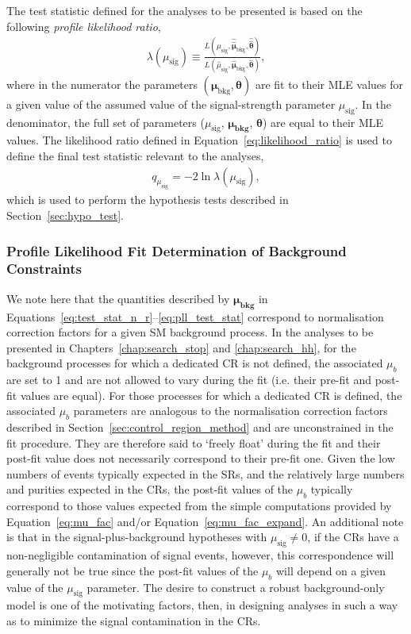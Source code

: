 The test statistic defined for the analyses to be presented is based on the following
\textit{profile likelihood ratio},
\begin{align}
    \lambda(\mu_{\text{sig}}) \equiv
        \frac{
            L(\mu_{\text{sig}}, \hat{\hat{\bm{\mu}}}_{\text{bkg}}, \hat{\hat{\bm{\theta}}})
        }
        {
            L(\hat{\mu}_{\text{sig}}, \hat{\bm{\mu}}_{\text{bkg}}, \hat{\bm{\theta}})
        },
    \label{eq:likelihood_ratio}
\end{align}
where in the numerator the parameters $(\bm{\mu}_{\text{bkg}}, \bm{\theta})$ are fit to their MLE values
for a given value of the assumed value of the signal-strength parameter $\mu_{\text{sig}}$.
In the denominator, the full set of parameters ($\mu_{\text{sig}}$, $\bm{\mu_{\text{bkg}}}$, $\bm{\theta}$) are
equal to their MLE values.
The likelihood ratio defined in Equation~\ref{eq:likelihood_ratio} is used to define the
final test statistic relevant to the analyses,
\begin{align}
    q_{\mu_{\text{sig}}} = - 2 \ln \lambda (\mu_{\text{sig}}),
    \label{eq:pll_test_stat}
\end{align}
which is used to perform the hypothesis tests described in Section~\ref{sec:hypo_test}.

\subsubsection{Profile Likelihood Fit Determination of Background Constraints}

We note here that the quantities described by $\bm{\mu_{\text{bkg}}}$ in Equations~\ref{eq:test_stat_n_r}--\ref{eq:pll_test_stat} correspond to normalisation correction
factors for a given SM background process.
In the analyses to be presented in Chapters~\ref{chap:search_stop} and \ref{chap:search_hh},
for the background processes for which a dedicated CR is not defined, the associated $\mu_b$ are
set to 1 and are not allowed to vary during the fit (i.e. their pre-fit and post-fit values are equal).
For those processes for which a dedicated CR is defined, the associated $\mu_b$ parameters
are analogous to the normalisation correction factors described in Section~\ref{sec:control_region_method} and
are unconstrained in the fit procedure.
They are therefore said to `freely float' during the fit and 
their post-fit value does not necessarily correspond to their pre-fit one.
Given the low numbers of events typically expected in the SRs, and the relatively
large numbers and purities expected in the CRs, the post-fit values of the $\mu_b$ typically
correspond to those values expected from the simple computations provided by Equation~\ref{eq:mu_fac}
and/or Equation~\ref{eq:mu_fac_expand}.
An additional note is that in the signal-plus-background hypotheses with $\mu_{\text{sig}} \ne 0$, if
the CRs have a non-negligible contamination of signal events, however, this correspondence will generally not be true
since the post-fit values of the $\mu_b$ will depend on a given value of the $\mu_{\text{sig}}$ parameter.
The desire to construct a robust background-only model is one of the motivating factors, then,
in designing analyses in such a way as to minimize the signal contamination in the CRs.

